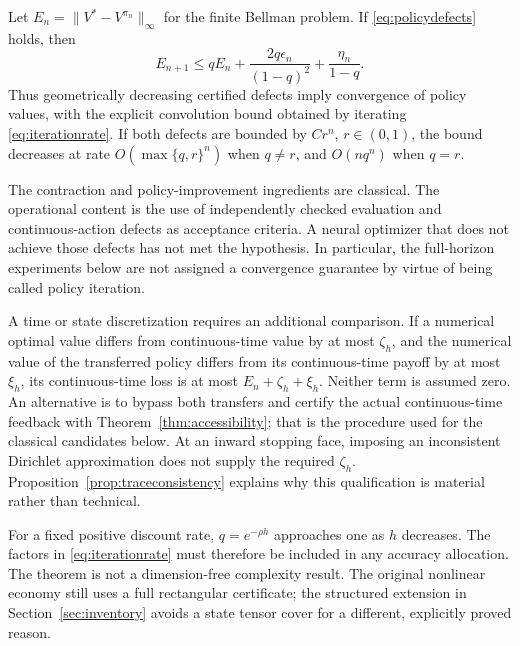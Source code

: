 \begin{theorem}\label{thm:iteration}
Let $E_n=\|V^*-V^{\pi_n}\|_\infty$ for the finite Bellman problem. If \eqref{eq:policydefects} holds, then
\begin{equation}
 E_{n+1}\leq qE_n+\frac{2q\epsilon_n}{(1-q)^2}+\frac{\eta_n}{1-q}.
 \label{eq:iterationrate}
\end{equation}
Thus geometrically decreasing certified defects imply convergence of policy values, with the explicit convolution bound obtained by iterating \eqref{eq:iterationrate}. If both defects are bounded by $C r^n$, $r\in(0,1)$, the bound decreases at rate $O(\max\{q,r\}^n)$ when $q\ne r$, and $O(nq^n)$ when $q=r$.
\end{theorem}
The contraction and policy-improvement ingredients are classical. The operational content is the use of independently checked evaluation and continuous-action defects as acceptance criteria. A neural optimizer that does not achieve those defects has not met the hypothesis. In particular, the full-horizon experiments below are not assigned a convergence guarantee by virtue of being called policy iteration.

A time or state discretization requires an additional comparison. If a numerical optimal value differs from continuous-time value by at most $\zeta_h$, and the numerical value of the transferred policy differs from its continuous-time payoff by at most $\xi_h$, its continuous-time loss is at most $E_n+\zeta_h+\xi_h$. Neither term is assumed zero. An alternative is to bypass both transfers and certify the actual continuous-time feedback with Theorem~\ref{thm:accessibility}; that is the procedure used for the classical candidates below. At an inward stopping face, imposing an inconsistent Dirichlet approximation does not supply the required $\zeta_h$. Proposition~\ref{prop:traceconsistency} explains why this qualification is material rather than technical.

For a fixed positive discount rate, $q=e^{-\rho h}$ approaches one as $h$ decreases. The factors in \eqref{eq:iterationrate} must therefore be included in any accuracy allocation. The theorem is not a dimension-free complexity result. The original nonlinear economy still uses a full rectangular certificate; the structured extension in Section~\ref{sec:inventory} avoids a state tensor cover for a different, explicitly proved reason.
